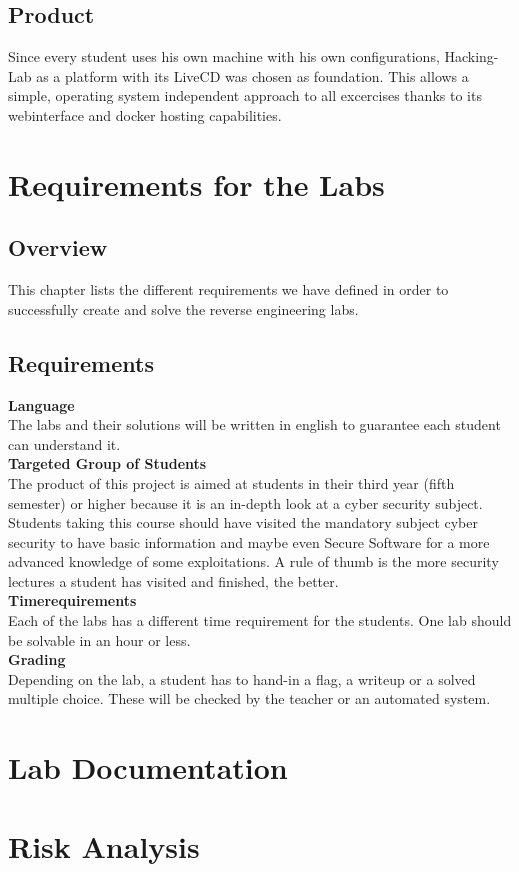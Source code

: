 \subsection{Product}
Since every student uses his own machine with his own configurations, Hacking-Lab as a platform with its LiveCD was chosen as foundation. This allows a simple, operating system independent approach to all excercises thanks to its webinterface and docker hosting capabilities. 

\section{Requirements for the Labs}

\subsection{Overview}
This chapter lists the different requirements we have defined in order to successfully create and solve the reverse engineering labs.
\subsection{Requirements}
\textbf{Language} \\
The labs and their solutions will be written in english to guarantee each student can understand it. \\[0.5cm]
\textbf{Targeted Group of Students} \\
The product of this project is aimed at students in their third year (fifth semester) or higher because it is an in-depth look at a cyber security subject. Students taking this course should have visited the mandatory subject cyber security to have basic information and maybe even Secure Software for a more advanced knowledge of some exploitations. A rule of thumb is the more security lectures a student has visited and finished, the better. \\[0.5cm]
\textbf{Timerequirements} \\
Each of the labs has a different time requirement for the students. One lab should be solvable in an hour or less.  \\[0.5cm]
\textbf{Grading} \\
Depending on the lab, a student has to hand-in a flag, a writeup or a solved multiple choice. These will be checked by the teacher or an automated system. \\[0.5cm]

\section{Lab Documentation}


\section{Risk Analysis}

